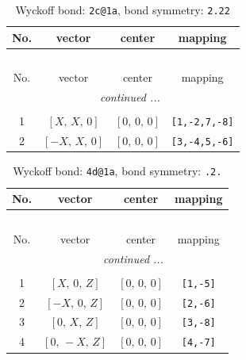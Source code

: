 \documentclass[fleqn,8pt]{jsarticle}
\begin{document}
\renewcommand{\arraystretch}{1.2}
\begin{longtable}{cccc}
\caption{Wyckoff bond: {\tt 2c@1a}, bond symmetry: {\tt 2.22}}
 \\
 \hline \hline
No. & vector & center & mapping \\ \hline \endfirsthead

\multicolumn{3}{l}{\tablename\ \thetable{}} \\
 \hline \hline
No. & vector & center & mapping \\ \hline \endhead

 \hline \hline
\multicolumn{3}{r}{\footnotesize\it continued ...} \\ \endfoot

 \hline \hline
\multicolumn{3}{r}{} \\ \endlastfoot

1 & $\left[ X,\, X,\, 0 \right]$ & $\left[ 0,\, 0,\, 0 \right]$ & {\tt [1,-2,7,-8]} \\ \hline
2 & $\left[ - X,\, X,\, 0 \right]$ & $\left[ 0,\, 0,\, 0 \right]$ & {\tt [3,-4,5,-6]} \\
\end{longtable}
\renewcommand{\arraystretch}{1.2}
\begin{longtable}{cccc}
\caption{Wyckoff bond: {\tt 4d@1a}, bond symmetry: {\tt .2.}}
 \\
 \hline \hline
No. & vector & center & mapping \\ \hline \endfirsthead

\multicolumn{3}{l}{\tablename\ \thetable{}} \\
 \hline \hline
No. & vector & center & mapping \\ \hline \endhead

 \hline \hline
\multicolumn{3}{r}{\footnotesize\it continued ...} \\ \endfoot

 \hline \hline
\multicolumn{3}{r}{} \\ \endlastfoot

1 & $\left[ X,\, 0,\, Z \right]$ & $\left[ 0,\, 0,\, 0 \right]$ & {\tt [1,-5]} \\ \hline
2 & $\left[ - X,\, 0,\, Z \right]$ & $\left[ 0,\, 0,\, 0 \right]$ & {\tt [2,-6]} \\ \hline
3 & $\left[ 0,\, X,\, Z \right]$ & $\left[ 0,\, 0,\, 0 \right]$ & {\tt [3,-8]} \\ \hline
4 & $\left[ 0,\, - X,\, Z \right]$ & $\left[ 0,\, 0,\, 0 \right]$ & {\tt [4,-7]} \\
\end{longtable}
\end{document}
